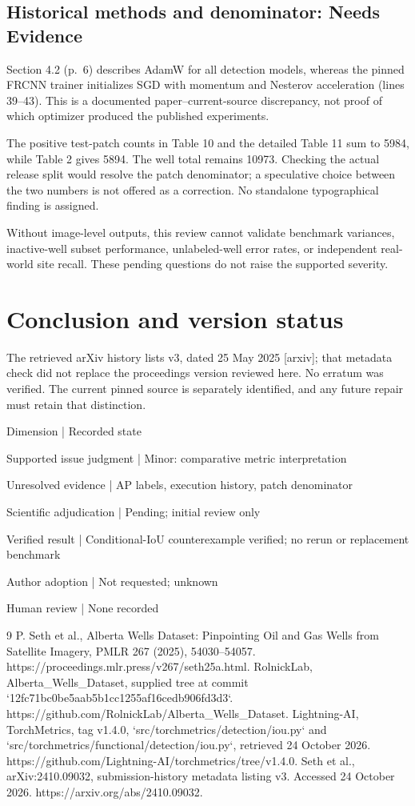 \documentclass[10pt]{article}
\begin{document}
\subsection*{Historical methods and denominator: Needs Evidence}
Section 4.2 (p. 6) describes AdamW for all detection models, whereas the pinned FRCNN trainer initializes SGD with momentum and Nesterov acceleration (lines 39–43). This is a documented paper–current-source discrepancy, not proof of which optimizer produced the published experiments.\par
The positive test-patch counts in Table 10 and the detailed Table 11 sum to 5984, while Table 2 gives 5894. The well total remains 10973. Checking the actual release split would resolve the patch denominator; a speculative choice between the two numbers is not offered as a correction. No standalone typographical finding is assigned.\par
Without image-level outputs, this review cannot validate benchmark variances, inactive-well subset performance, unlabeled-well error rates, or independent real-world site recall. These pending questions do not raise the supported severity.\par
\section*{Conclusion and version status}
The retrieved arXiv history lists v3, dated 25 May 2025 [arxiv]; that metadata check did not replace the proceedings version reviewed here. No erratum was verified. The current pinned source is separately identified, and any future repair must retain that distinction.\par
Dimension | Recorded state\par
Supported issue judgment | Minor: comparative metric interpretation\par
Unresolved evidence | AP labels, execution history, patch denominator\par
Scientific adjudication | Pending; initial review only\par
Verified result | Conditional-IoU counterexample verified; no rerun or replacement benchmark\par
Author adoption | Not requested; unknown\par
Human review | None recorded\par
9 P. Seth et al., Alberta Wells Dataset: Pinpointing Oil and Gas Wells from Satellite Imagery, PMLR 267 (2025), 54030–54057. https://proceedings.mlr.press/v267/seth25a.html. RolnickLab, Alberta\_Wells\_Dataset, supplied tree at commit `12fc71bc0be5aab5b1cc1255af16cedb906fd3d3`. https://github.com/RolnickLab/Alberta\_Wells\_Dataset. Lightning-AI, TorchMetrics, tag v1.4.0, `src/torchmetrics/detection/iou.py` and `src/torchmetrics/functional/detection/iou.py`, retrieved 24 October 2026. https://github.com/Lightning-AI/torchmetrics/tree/v1.4.0. Seth et al., arXiv:2410.09032, submission-history metadata listing v3. Accessed 24 October 2026. https://arxiv.org/abs/2410.09032.\par
\end{document}
